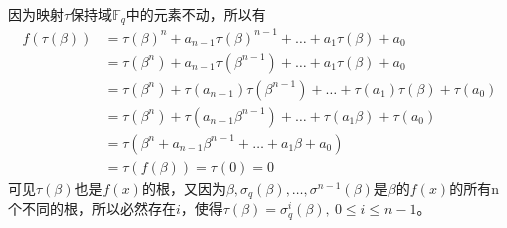 \begin{solution}\ \\
    因为映射$\tau$保持域$\mathbb{F}_{q}$中的元素不动，所以有
    \begin{equation*}
        \begin{aligned}
            f(\tau(\beta))
            &=\tau(\beta)^n+a_{n-1}\tau(\beta)^{n-1}+\dots+a_1\tau(\beta)+a_0\\
            &=\tau(\beta^n)+a_{n-1}\tau(\beta^{n-1})+\dots+a_1\tau(\beta)+a_0\\
            &=\tau(\beta^n)+\tau(a_{n-1})\tau(\beta^{n-1})+\dots+\tau(a_1)\tau(\beta)+\tau(a_0)\\
            &=\tau(\beta^n)+\tau(a_{n-1}\beta^{n-1})+\dots+\tau(a_1\beta)+\tau(a_0)\\
            &=\tau(\beta^n+a_{n-1}\beta^{n-1}+\dots+a_1\beta+a_0)\\
            &=\tau(f(\beta))=\tau(0)=0
        \end{aligned}
    \end{equation*}
    可见$\tau(\beta)$也是$f(x)$的根，又因为$\beta,\sigma_q(\beta),\dots,\sigma^{n-1}(\beta)$是$\beta$的$f(x)$的所有n个不同的根，所以必然存在$i$，使得$\tau(\beta)=\sigma_q^i(\beta),\ 0\leq i\leq n-1$。
\end{solution}